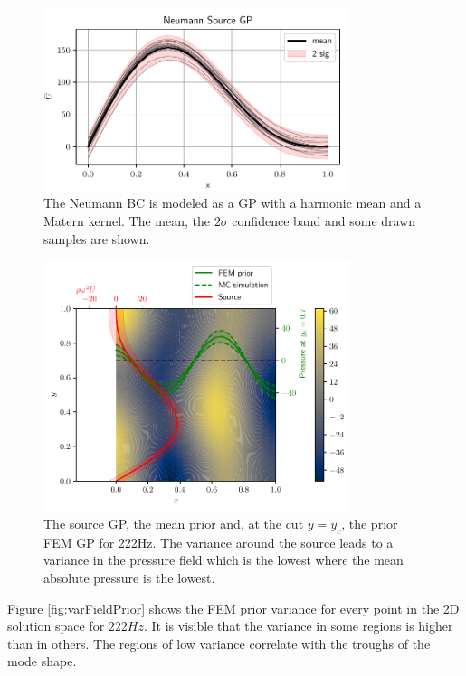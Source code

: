 \documentclass[%
  a4paper,oneside,%
  11pt,%
  smallchapters,
  style=printdev,
  extramargin,
  green,%
  rgb, <cmyk>
  ]{tubsbook}
\begin{document}
\begin{figure}[!ht]
\includegraphics[width=0.8\textwidth]{pics/NeumannBC.pdf}
\centering
\caption{The Neumann BC is modeled as a GP with a harmonic mean and a Matern kernel. The mean, the $2 \sigma$ confidence band and some drawn samples are shown.}
\label{fig:NeumannBC}
\end{figure}
%
\begin{figure}[!ht]
\includegraphics[width=0.8\textwidth]{pics/SolutionCustom2D.pdf}
\centering
\caption{The source GP, the mean prior and, at the cut $y=y_c$, the prior FEM GP for 222Hz. The variance around the source leads to a variance in the pressure field which is the lowest where the mean absolute pressure is the lowest.}
\label{fig:FEMGP}
\end{figure}
%
Figure \ref{fig:varFieldPrior} shows the FEM prior variance for every point in the 2D solution space for $222Hz$. It is visible that the variance in some regions is higher than in others. The regions of low variance correlate with the troughs of the mode shape.
%
\end{document}
